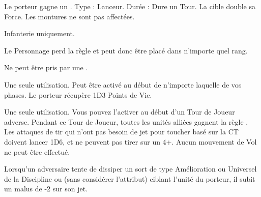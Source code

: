 \armytalismans

\startpricelist

 Le porteur gagne un .\newline
Type : Lanceur. Durée : Dure un Tour.\newline
La cible double sa Force. Les montures ne sont pas affectées.%

\endpricelist

\armyenchanteditems

\startpricelist

Infanterie uniquement.

Le Personnage perd la règle \firstinrank{} et peut donc être placé dans n'importe quel rang.

Ne peut être pris par une \largetarget{}.

Une seule utilisation. Peut être activé au début de n'importe laquelle de vos phases. Le porteur récupère 1D3 Points de Vie.
\endpricelist

\armymagicalbanners

\startpricelist

Une seule utilisation. Vous pouvez l'activer au début d'un Tour de Joueur adverse. Pendant ce Tour de Joueur, toutes les unités alliées gagnent la règle \hardtarget{}. Les attaques de tir qui n'ont pas besoin de jet pour toucher basé sur la CT doivent lancer 1D6, et ne peuvent pas tirer sur un 4+. Aucun mouvement de Vol ne peut être effectué.

Lorsqu'un adversaire tente de dissiper un sort de type Amélioration ou Universel de la Discipline \ruin{} ou \disease{} (sans considérer l'attribut) ciblant l'unité du porteur, il subit un malus de -2 sur son jet.

\endpricelist

\closearmymagicalitems




%



\quickrefsheettitle

